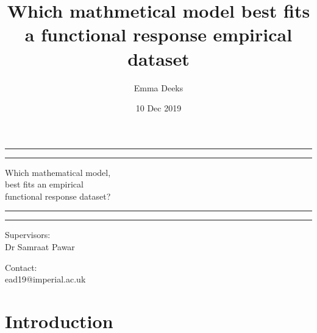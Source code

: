 \documentclass[11pt]{article}
\title {Which mathmetical model best fits a functional response empirical dataset}
\author{Emma Deeks}
\date{10 Dec 2019}
\begin{document}
\begin{titlepage}


	\centering %
		
	
	
	
	\vspace*{5\baselineskip}
	
	\rule{\textwidth}{1.6pt}\vspace*{-\baselineskip}\vspace*{2pt} %
	\rule{\textwidth}{0.4pt} %
	
	\vspace{0.75\baselineskip} %
	
	{\LARGE Which mathematical model, \\ best fits an empirical \\
		functional response dataset? \\} 
	
	\vspace{0.75\baselineskip} %
	
	\rule{\textwidth}{0.4pt}\vspace*{-\baselineskip}\vspace{3.2pt} 
	\rule{\textwidth}{1.6pt} 
	
	\vspace{2\baselineskip} 
	
	
	Supervisors: \\
		Dr Samraat Pawar
			

		
	\vspace{1.5 \baselineskip} %
	
	Contact: \\
	ead19@imperial.ac.uk
	

\end{titlepage}

\linenumbers
	
	\section{Introduction}
	\noindent
	
\end{document}
